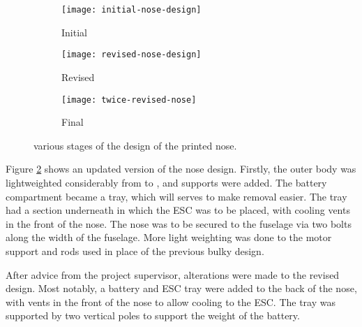 \documentclass[../../main.tex]{subfiles}
\begin{document}
\begin{figure}[H]
    \centering
    \begin{subfigure}[b]{0.6\columnwidth}
        \centering
        \texttt{[image: initial-nose-design]}
        \caption{Initial}
        \label{fig:nose-design-progression:initial}
    \end{subfigure}
    
    \begin{subfigure}[b]{0.6\columnwidth}
        \centering
        \texttt{[image: revised-nose-design]}
        \caption{Revised}
        \label{fig:nose-design-progression:revised}
    \end{subfigure}

    \begin{subfigure}[b]{0.6\columnwidth}
        \centering
        \texttt{[image: twice-revised-nose]}
        \caption{Final}
        \label{fig:nose-design-progression:final}
    \end{subfigure}
    
    \caption{various stages of the design of the printed nose.}
    \label{fig:nose-design-progression}
\end{figure} 


Figure \ref{fig:nose-design-progression:revised} shows an updated version of the nose design.
Firstly, the outer body was lightweighted considerably from  to , and supports were added.
The battery compartment became a tray, which will serves to make removal easier.
The tray had a section underneath in which the ESC was to be placed, with cooling vents in the front of the nose.
The nose was to be secured to the fuselage via two bolts along the width of the fuselage.
More light weighting was done to the motor support and rods used in place of the previous bulky design. 


After advice from the project supervisor, alterations were made to the revised design.
Most notably, a battery and ESC tray were added to the back of the nose, with vents in the front of the nose to allow cooling to the ESC.
The tray was supported by two vertical poles to support the weight of the battery. 

\end{document}
